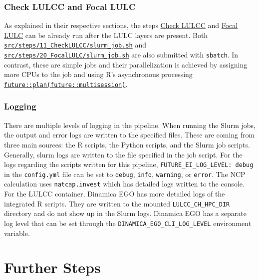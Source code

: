 \documentclass[
  letterpaper,
  DIV=11,
  numbers=noendperiod]{scrreprt}
\begin{document}
\subsection{Check LULCC and Focal
LULC}\label{check-lulcc-and-focal-lulc}

As explained in their respective sections, the steps
\href{11_CheckLULCC.html}{Check LULCC} and
\href{20_FocalLULC.html}{Focal LULC} can be already run after the LULC
layers are present. Both
\href{https://github.com/cbueth/Future-EI/tree/main/src/steps/11_CheckLULCC/slurm_job.sh}{\texttt{src/steps/11\_CheckLULCC/slurm\_job.sh}}
and
\href{https://github.com/cbueth/Future-EI/tree/main/src/steps/20_FocalLULC/slurm_job.sh}{\texttt{src/steps/20\_FocalLULC/slurm\_job.sh}}
are also submitted with \texttt{sbatch}. In contrast, these are simple
jobs and their parallelization is achieved by assigning more CPUs to the
job and using R's asynchronous processing
\href{https://rdrr.io/cran/future/man/multisession.html}{\texttt{future::plan(future::multisession)}}.

\subsection{Logging}\label{logging}

There are multiple levels of logging in the pipeline. When running the
Slurm jobs, the output and error logs are written to the specified
files. These are coming from three main sources: the R scripts, the
Python scripts, and the Slurm job scripts. Generally, slurm logs are
written to the file specified in the job script. For the logs regarding
the scripts written for this pipeline,
\texttt{FUTURE\_EI\_LOG\_LEVEL:\ debug} in the \texttt{config.yml} file
can be set to \texttt{debug}, \texttt{info}, \texttt{warning}, or
\texttt{error}. The NCP calculation uses \texttt{natcap.invest} which
has detailed logs written to the console. For the LULCC container,
Dinamica EGO has more detailed logs of the integrated R scripts. They
are written to the mounted \texttt{LULCC\_CH\_HPC\_DIR} directory and do
not show up in the Slurm logs. Dinamica EGO has a separate log level
that can be set through the \texttt{DINAMICA\_EGO\_CLI\_LOG\_LEVEL}
environment variable.


\chapter{Further Steps}\label{further-steps}
\end{document}
